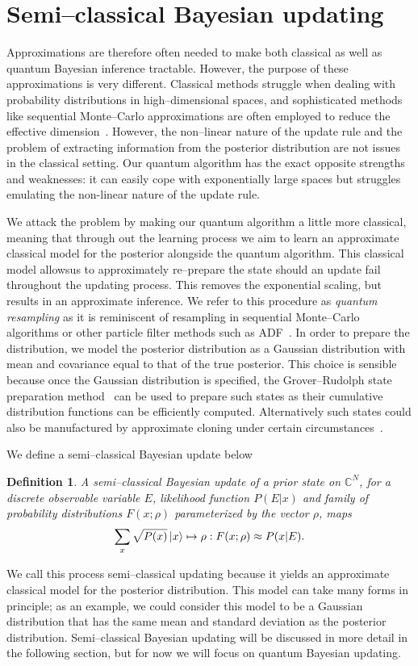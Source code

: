 \documentclass[aps,amsmath,onecolumn,amssymb]{revtex4}
\newtheorem{definition}{Definition}
\begin{document}
\section{Semi--classical Bayesian updating}
Approximations are therefore often needed to make both classical as well as quantum Bayesian inference tractable.  However, the purpose of these approximations is very different.  Classical methods struggle when dealing with probability distributions in high--dimensional spaces, and sophisticated methods like sequential Monte--Carlo approximations are often employed to reduce the effective dimension~\cite{liu_combined_2001,minka2001expectation,van2000unscented}.  However, the non--linear nature of the update rule and the problem of extracting information from the posterior distribution are not issues in the classical setting.  Our quantum algorithm has the exact opposite strengths and weaknesses: it can easily cope with exponentially large spaces but struggles emulating the non-linear nature of the update rule.

We attack the problem by making our quantum algorithm a little more classical, meaning that through out the learning process we aim to learn an approximate classical model for the posterior alongside the quantum algorithm.  This classical model allowsus to approximately re--prepare the state should an update fail throughout the updating process.  This removes the exponential scaling, but results in an approximate inference.  We refer to this procedure as \emph{quantum resampling} as it is reminiscent of resampling in sequential Monte--Carlo algorithms or other particle filter methods such as ADF~\cite{minka2001expectation}.  In order to prepare the distribution,
we model the posterior distribution as a Gaussian distribution with mean and covariance equal to that of the true posterior.  This choice is sensible because once the Gaussian distribution is specified, the Grover--Rudolph state preparation method~\cite{GR02} can be used to prepare such states as their cumulative distribution functions can be efficiently computed.
Alternatively such states could also be manufactured by approximate cloning under certain circumstances~\cite{gisin1997optimal}.

We define a semi--classical Bayesian update below 
\begin{definition}
A semi--classical Bayesian update of a prior state on $\mathbb{C}^N$, for a discrete observable variable $E$, likelihood function $P(E|x)$ and family of probability distributions $F(x;\rho)$ parameterized by the vector $\rho$, maps 
$$\sum_x \sqrt{P(x)} \left|x\right\rangle\mapsto \rho: F(x;\rho) \approx P(x|E). $$\label{def:semi}
\end{definition}
We call this process semi--classical updating because it yields an approximate classical model for the posterior distribution.  This model can take many forms in principle; as an example, we could consider this model to be a Gaussian distribution that has the same mean and standard deviation as the posterior distribution.
Semi--classical Bayesian updating will be discussed in more detail in the following section, but for now we will focus on quantum Bayesian updating.
\end{document}
